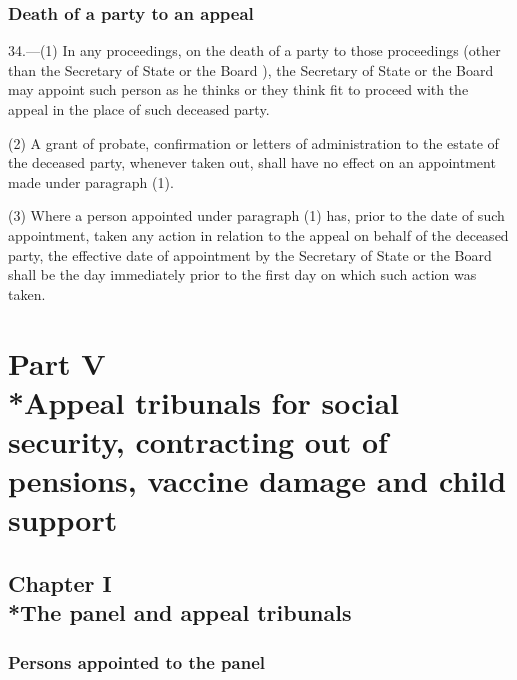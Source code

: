 \documentclass[12pt,a4paper]{article}
\begin{document}
\subsubsection[34. Death of a party to an appeal]{Death of a party to an appeal}

34.—(1) In any proceedings, on the death of a party to those proceedings (other than the Secretary of State
or the Board%
), the Secretary of State 
or the Board   %
may appoint such person as he thinks 
or they think   %
fit to proceed with the appeal in the place of such deceased party.

(2) A grant of probate, confirmation or letters of administration to the estate of the deceased party, whenever taken out, shall have no effect on an appointment made under paragraph (1).

(3) Where a person appointed under paragraph (1) has, prior to the date of such appointment, taken any action in relation to the appeal on behalf of the deceased party, the effective date of appointment by the Secretary of State 
or the Board   %
shall be the day immediately prior to the first day on which such action was taken.


\section[Part V --- Appeal tribunals for social security, contracting out of pensions, vaccine damage and child support]{Part V\\*Appeal tribunals for social security, contracting out of pensions, vaccine damage and child support}

\subsection[Chapter I --- The panel and appeal tribunals]{Chapter I\\*The panel and appeal tribunals}

\subsubsection[35. Persons appointed to the panel]{Persons appointed to the panel}
\end{document}
